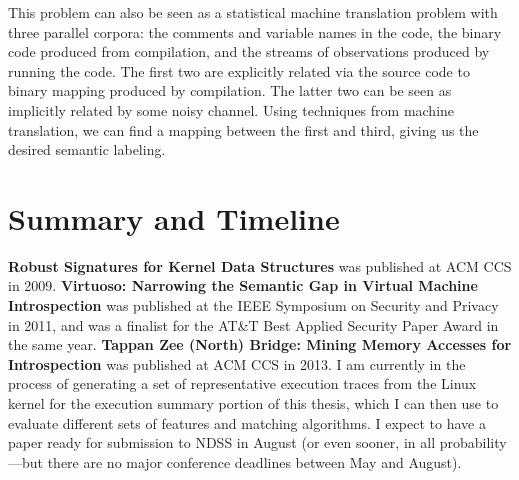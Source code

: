 \documentclass{article}
\begin{document}
This problem can also be seen as a statistical machine translation
problem with three parallel corpora: the comments and variable names in
the code, the binary code produced from compilation, and the streams of
observations produced by running the code. The first two are explicitly
related via the source code to binary mapping produced by compilation.
The latter two can be seen as implicitly related by some noisy channel.
Using techniques from machine translation, we can find a mapping between
the first and third, giving us the desired semantic labeling.

\section{Summary and Timeline}

\textbf{Robust Signatures for Kernel Data Structures} was published at
ACM CCS in 2009. \textbf{Virtuoso: Narrowing the Semantic Gap in Virtual
Machine Introspection} was published at the IEEE Symposium on Security
and Privacy in 2011, and was a finalist for the AT\&T Best Applied
Security Paper Award in the same year. \textbf{Tappan Zee (North)
Bridge: Mining Memory Accesses for Introspection} was published at ACM
CCS in 2013. I am currently in the process of generating a set of
representative execution traces from the Linux kernel for the execution
summary portion of this thesis, which I can then use to evaluate
different sets of features and matching algorithms. I expect to have a
paper ready for submission to NDSS in August (or even sooner, in all
probability---but there are no major conference deadlines between May
and August).



\end{document}
